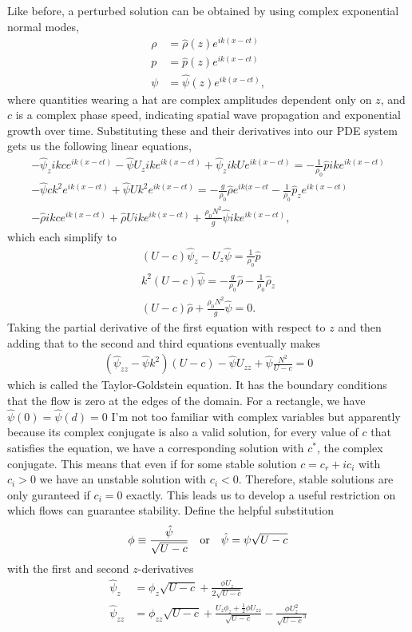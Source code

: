 \documentclass[10pt]{article}
\begin{document}
Like before, a perturbed solution can be obtained by using complex exponential normal modes,
\begin{align}
    \rho & = \hat\rho(z)e^{ik(x-ct)} \\
    p & = \hat{p}(z)e^{ik(x-ct)} \\
    \psi & = \hat\psi(z)e^{ik(x-ct)},
\end{align}
where quantities wearing a hat are complex amplitudes dependent only on $z$, and $c$ is a complex phase speed, indicating spatial wave propagation and exponential growth over time. Substituting these and their derivatives into our PDE system gets us the following linear equations,
\begin{align}
    -\hat\psi_zikce^{ik(x-ct)} - \hat\psi U_z ike^{ik(x-ct)} + \hat\psi_zikUe^{ik(x-ct)} = -\frac{1}{\rho_0}\hat{p}ike^{ik(x-ct)} \\
    -\hat\psi ck^2e^{ik(x-ct)} + \hat\psi Uk^2e^{ik(x-ct)} = -\frac{g}{\rho_0}\hat\rho e^{ik(x-ct} - \frac{1}{\rho_0}\hat{p}_ze^{ik(x-ct)} \\
    -\hat\rho ikce^{ik(x-ct)} + \hat\rho Uike^{ik(x-ct)} + \frac{\rho_0N^2}{g}\hat\psi ike^{ik(x-ct)},
\end{align}
which each simplify to
\begin{align}
    (U-c)\hat\psi_z - U_z\hat\psi = \frac{1}{\rho_0}\hat{p} \\
    k^2(U-c)\hat\psi = -\frac{g}{\rho_0}\hat\rho - \frac{1}{\rho_0}\hat\rho_z \\
    (U-c)\hat\rho + \frac{\rho_0N^2}{g}\hat\psi = 0.
\end{align}
Taking the partial derivative of the first equation with respect to $z$ and then adding that to the second and third equations eventually makes
\begin{align}
    (\hat\psi_{zz} - \hat\psi k^2)(U-c) - \hat\psi U_{zz} + \hat\psi\frac{N^2}{U-c} = 0
\end{align}
which is called the Taylor-Goldstein equation. It has the boundary conditions that the flow is zero at the edges of the domain. For a rectangle, we have $\hat\psi(0) = \hat\psi(d) = 0$ I'm not too familiar with complex variables but apparently because its complex conjugate is also a valid solution, for every value of $c$ that satisfies the equation, we have a corresponding solution with $c^*$, the complex conjugate. This means that even if for some stable solution $c = c_r + ic_i$ with $c_i > 0$ we have an unstable solution with $c_i < 0$. Therefore, stable solutions are only guranteed if $c_i = 0$ exactly. This leads us to develop a useful restriction on which flows can guarantee stability. Define the helpful substitution
\begin{align}
    \phi \equiv \frac{\hat\psi}{\sqrt{U-c}} \qq{or} \hat\psi = \psi\sqrt{U-c}
\end{align}
with the first and second $z$-derivatives
\begin{align}
    \hat\psi_z & = \phi_z\sqrt{U-c} + \frac{\phi U_z}{2\sqrt{U-c}} \\
    \hat\psi_{zz} & = \phi_{zz}\sqrt{U-c} + \frac{U_z\phi_z + \frac{1}{2}\phi U_{zz}}{\sqrt{U-c}} - \frac{\phi U_z^2}{\sqrt{U-c}^3}
\end{align}
\end{document}

